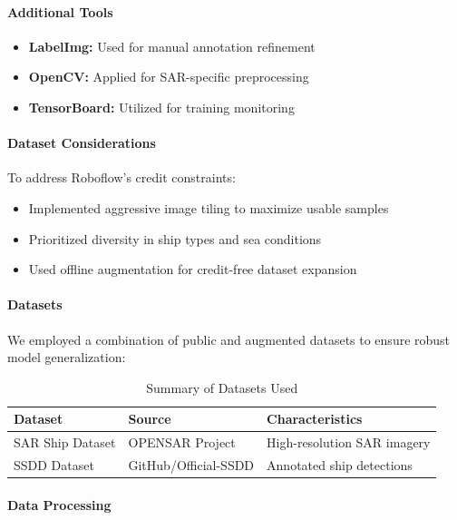 \documentclass{article}
\begin{document}
\paragraph{Additional Tools}
\begin{itemize}
    \item \textbf{LabelImg:} Used for manual annotation refinement
    \item \textbf{OpenCV:} Applied for SAR-specific preprocessing
    \item \textbf{TensorBoard:} Utilized for training monitoring
\end{itemize}

\paragraph{Dataset Considerations}
To address Roboflow's credit constraints:
\begin{itemize}
    \item Implemented aggressive image tiling to maximize usable samples
    \item Prioritized diversity in ship types and sea conditions
    \item Used offline augmentation for credit-free dataset expansion
\end{itemize}

\paragraph{Datasets}

We employed a combination of public and augmented datasets to ensure robust model generalization:

\begin{table}[h!]
\centering
\begin{tabular}{|l|l|l|}
\hline
\textbf{Dataset} & \textbf{Source} & \textbf{Characteristics} \\
\hline
SAR Ship Dataset & OPENSAR Project & High-resolution SAR imagery \\
SSDD Dataset     & GitHub/Official-SSDD & Annotated ship detections \\
\hline
\end{tabular}
\caption{Summary of Datasets Used}
\end{table}

\paragraph{Data Processing}
\end{document}
